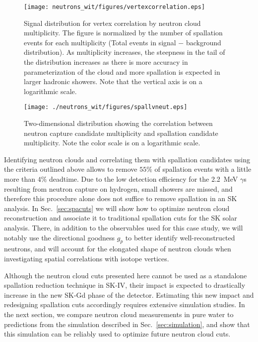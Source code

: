 \begin{figure}
    \centering
    \texttt{[image: neutrons\_wit/figures/vertexcorrelation.eps]}    %
    \caption{Signal distribution for vertex correlation by neutron cloud multiplicity. The figure is normalized by the number of spallation events for each multiplicity (Total events in signal $-$ background distribution). As multiplicity increases, the steepness in the tail of the distribution increases as there is more accuracy in parameterization of the cloud and more spallation is expected in larger hadronic showers. Note that the vertical axis is on a logarithmic scale.}
    \label{fig:spallvertex}
\end{figure}


\begin{figure}
    \centering
    \texttt{[image: ./neutrons\_wit/figures/spallvneut.eps]}    %
    \caption{Two-dimensional distribution showing the correlation between neutron capture candidate multiplicity and spallation candidate multiplicity. Note the color scale is on a logarithmic scale.}
    \label{fig:neutvspall}
\end{figure}

Identifying neutron clouds and correlating them with spallation candidates using the criteria outlined above allows to remove $55\%$ of spallation events with a little more than $4\%$ deadtime. Due to the low detection efficiency for the 2.2~MeV $\gamma$s resulting from neutron capture on hydrogen, small showers are missed, and therefore this procedure alone does not suffice to remove spallation in an SK analysis. In Sec.~\ref{sec:spacuts} we will show how to optimize neutron cloud reconstruction and associate it to traditional spallation cuts for the SK solar analysis. There, in addition to the observables used for this case study, we will notably use the directional goodness $g_p$ to better identify well-reconstructed neutrons, and will account for the elongated shape of neutron clouds when investigating spatial correlations with isotope vertices. 

Although the neutron cloud cuts presented here cannot be used as a standalone spallation reduction technique in SK-IV, their impact is expected to drastically increase in the new SK-Gd phase of the detector. Estimating this new impact and redesigning spallation cuts accordingly requires extensive simulation studies. In the next section, we compare neutron cloud measurements in pure water to predictions from the simulation described in Sec.~\ref{sec:simulation}, and show that this simulation can be reliably used to optimize future neutron cloud cuts.